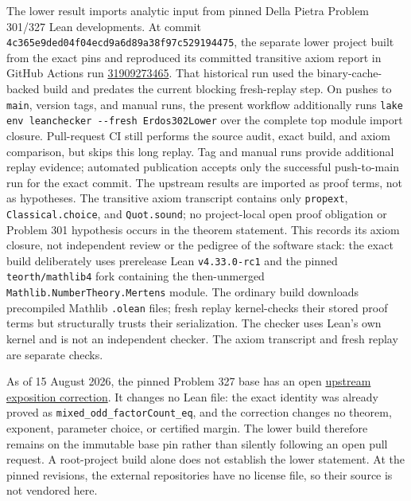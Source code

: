 \documentclass[11pt]{article}
\theoremstyle{definition}
\theoremstyle{plain}
\begin{document}
The lower result imports analytic input from pinned Della Pietra Problem
301/327 Lean developments.  At commit
\texttt{4c365e9ded04f04ecd9a6d89a38f97c529194475}, the separate lower project
built from the exact pins and reproduced its committed transitive axiom report
in GitHub Actions run
\href{https://github.com/khanukov/erdos302/actions/runs/31909273465}{31909273465}.
That historical run used the binary-cache-backed build and predates the
current blocking fresh-replay step. On pushes to \texttt{main}, version tags,
and manual runs, the present workflow additionally runs
\texttt{lake env leanchecker {-}{-}fresh Erdos302Lower} over the complete top
module import closure. Pull-request CI still performs the source audit, exact
build, and axiom comparison, but skips this long replay. Tag and manual runs
provide additional replay evidence; automated publication accepts only the
successful push-to-main run for the exact commit. The upstream results are
imported as proof terms, not as hypotheses.
The transitive axiom transcript contains only \texttt{propext},
\texttt{Classical.choice}, and \texttt{Quot.sound}; no project-local open proof
obligation or Problem 301 hypothesis occurs in the theorem statement.  This
records its axiom closure, not independent review or the pedigree of the
software stack: the exact build deliberately uses prerelease Lean
\texttt{v4.33.0-rc1} and the pinned \texttt{teorth/mathlib4} fork containing
the then-unmerged \texttt{Mathlib.NumberTheory.\allowbreak Mertens} module.
The ordinary build downloads precompiled Mathlib \texttt{.olean} files; fresh replay
kernel-checks their stored proof terms but structurally trusts their
serialization. The checker uses Lean's own kernel and is not an independent
checker. The axiom transcript and fresh replay are separate checks.

As of 15 August 2026, the pinned Problem 327 base has an open
\href{https://github.com/donalddellapietra/erdos-327-proof/pull/1}{upstream
exposition correction}.  It changes no Lean file: the exact identity was
already proved as \texttt{mixed\_odd\_factorCount\_eq}, and the correction
changes no theorem, exponent, parameter choice, or certified margin.  The
lower build therefore remains on the immutable base pin rather than silently
following an open pull request.  A root-project build alone does not establish
the lower statement.
At the pinned revisions, the external repositories have no license file, so
their source is not vendored here.
\end{document}
